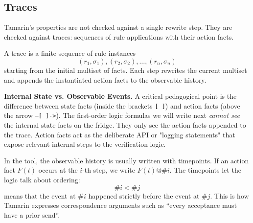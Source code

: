 \subsection{Traces}

Tamarin's properties are not checked against a single rewrite step.  They are
checked against traces: sequences of rule applications with their action
facts.

\begin{definition}[Trace]
\label{def:tamarin-trace}
A trace is a finite sequence of rule instances
\[
  (r_1,\sigma_1), (r_2,\sigma_2), \dots, (r_n,\sigma_n)
\]
starting from the initial multiset of facts.  Each step rewrites the current
multiset and appends the instantiated action facts to the observable history.
\end{definition}

\medskip\noindent
\textbf{Internal State vs. Observable Events.} A critical pedagogical point is the difference between state facts (inside the brackets \texttt{[ ]}) and action facts (above the arrow \texttt{--[ ]->}). The first-order logic formulas we will write next \emph{cannot see} the internal state facts on the fridge. They only see the action facts appended to the trace. Action facts act as the deliberate API or "logging statements" that expose relevant internal steps to the verification logic.

In the tool, the observable history is usually written with timepoints.  If an
action fact $F(t)$ occurs at the $i$-th step, we write $F(t)@\#i$.  The
timepoints let the logic talk about ordering:
\[
  \#i < \#j
\]
means that the event at $\#i$ happened strictly before the event at $\#j$.
This is how Tamarin expresses correspondence arguments such as ``every
acceptance must have a prior send''.

